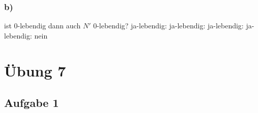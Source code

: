 \documentclass[12pt]{scrreprt}
\begin{document}
\subsubsection*{b)}
ist 0-lebendig dann auch $N'$ 0-lebendig? ja-lebendig: ja-lebendig: ja-lebendig: ja-lebendig: nein\newline

\newpage

\section{Übung 7}
\subsection*{Aufgabe 1}
\end{document}
